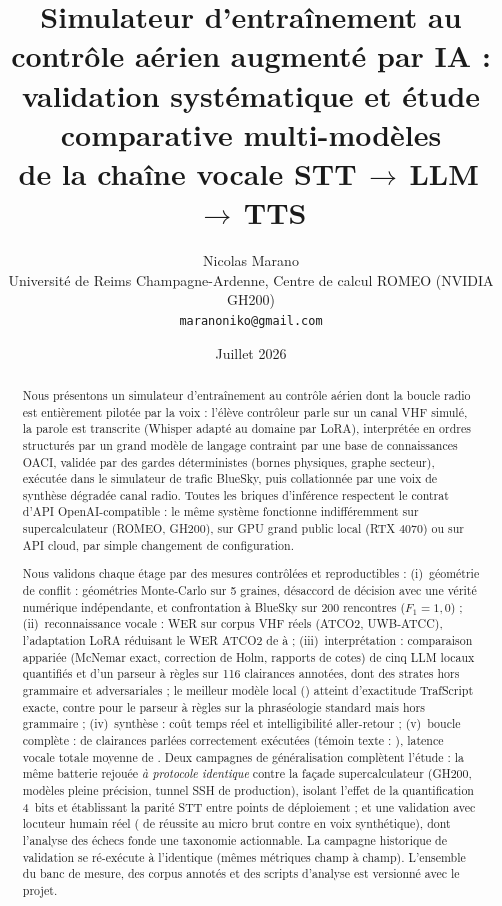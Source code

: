 \documentclass[10pt,a4paper]{article}
\title{\bfseries Simulateur d'entraînement au contrôle aérien augmenté par IA :\\
validation systématique et étude comparative multi-modèles\\
de la chaîne vocale STT\,$\rightarrow$\,LLM\,$\rightarrow$\,TTS}
\author{Nicolas Marano\\
\small Université de Reims Champagne-Ardenne, Centre de calcul ROMEO (NVIDIA GH200)\\
\small \texttt{maranoniko@gmail.com}}
\date{Juillet 2026}
\begin{document}
\maketitle

\begin{abstract}
\noindent
Nous présentons un simulateur d'entraînement au contrôle aérien dont la boucle
radio est entièrement pilotée par la voix : l'élève contrôleur parle sur un
canal VHF simulé, la parole est transcrite (Whisper adapté au domaine par
LoRA), interprétée en ordres structurés par un grand modèle de langage
contraint par une base de connaissances OACI, validée par des gardes
déterministes (bornes physiques, graphe secteur), exécutée dans le simulateur
de trafic BlueSky, puis collationnée par une voix de synthèse dégradée canal
radio. Toutes les briques d'inférence respectent le contrat d'API
OpenAI-compatible : le même système fonctionne indifféremment sur
supercalculateur (ROMEO, GH200), sur GPU grand public local (RTX 4070) ou sur
API cloud, par simple changement de configuration.

Nous validons chaque étage par des mesures contrôlées et reproductibles :
(i)~géométrie de conflit : \nCPAGeoms{} géométries Monte-Carlo sur 5 graines,
\nCPADesaccords{} désaccord de décision avec une vérité numérique
indépendante, et confrontation à BlueSky sur 200 rencontres
($F_1=1{,}0$) ; (ii)~reconnaissance vocale : WER sur corpus VHF réels
(ATCO2, UWB-ATCC), l'adaptation LoRA réduisant le WER ATCO2 de
\nWERVanillaAtcoVhf{} à \nWERLoraAtcoVhf{} ; (iii)~interprétation : comparaison appariée (McNemar exact, correction de Holm, rapports de cotes) de
cinq LLM locaux quantifiés et d'un parseur à règles sur 116 clairances
annotées, dont des strates hors grammaire et adversariales ; le meilleur
modèle local (\nLLMBestName) atteint \nLLMBestAcc{} d'exactitude TrafScript
exacte, contre \nParserInGrammar{} pour le parseur à règles sur la
phraséologie standard mais \nParserHorsGram{} hors grammaire ;
(iv)~synthèse : coût temps réel et intelligibilité aller-retour ;
(v)~boucle complète : \nEEVoix{} de clairances parlées correctement
exécutées (témoin texte : \nEETexte), latence vocale totale moyenne de
\nEELatMoy{}. Deux campagnes de généralisation complètent l'étude : la même
batterie rejouée \emph{à protocole identique} contre la façade
supercalculateur (GH200, modèles pleine précision, tunnel SSH de
production), isolant l'effet de la quantification 4~bits et établissant la
parité STT entre points de déploiement ; et une validation avec locuteur
humain réel (\nHumMicro{} de réussite au micro brut contre \nEEVoix{} en
voix synthétique), dont l'analyse des échecs fonde une taxonomie
actionnable. La campagne historique de validation se ré-exécute à
l'identique (mêmes métriques champ à champ). L'ensemble du banc de mesure,
des corpus annotés et des scripts d'analyse est versionné avec le projet.
\end{abstract}
\end{document}
